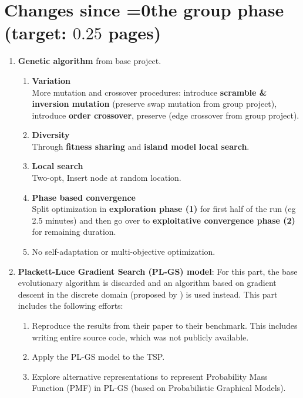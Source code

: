 \documentclass[a4paper,10pt]{article}
\def\retake{0}
\newcommand{\switch}[2]{\ifnum\retake=0{#1}\else{#2}\fi}
\newcommand{\ReplaceMe}[1]{{\color{blue}#1}}
\begin{document}
\section{Changes since \switch{the group phase}{your previous submission} (target: $0.25$ pages)}

\begin{enumerate}
	\item \textbf{Genetic algorithm} from base project.
	\begin{enumerate}
	\item \textbf{Variation} \\
			More mutation and crossover procedures: introduce \textbf{scramble \& inversion mutation} (preserve swap mutation from group project), introduce \textbf{order crossover}, preserve (edge crossover from group project).
				
	\item \textbf{Diversity} \\
			Through \textbf{fitness sharing} and \textbf{island model} \textbf{local search}.

	\item \textbf{Local search} \\
			Two-opt, Insert node at random location.
	
	\item \textbf{Phase based convergence} \\
		Split optimization in \textbf{exploration phase (1)} for first half of the run (eg 2.5 minutes) and then go over to \textbf{exploitative convergence phase (2)} for remaining duration.
		
	\item No self-adaptation or multi-objective optimization.
	\end{enumerate}
	
	\item \textbf{Plackett-Luce Gradient Search (PL-GS) model}: For this part, the base evolutionary algorithm is discarded and an algorithm based on gradient descent in the discrete domain (proposed by \citep{ceberiojosu_model-based_2023, santucci_gradient_2020}) is used instead. This part includes the following efforts:
		\begin{enumerate}
			\item Reproduce the results from their paper to their benchmark. This includes writing entire source code, which was not publicly available.
			\item Apply the PL-GS model to the TSP.
			\item Explore alternative representations to represent Probability Mass Function (PMF) in PL-GS (based on Probabilistic Graphical Models).
		\end{enumerate}
	
\end{enumerate}
\end{document}
